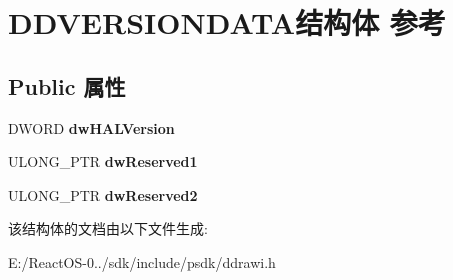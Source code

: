 \hypertarget{struct_d_d_v_e_r_s_i_o_n_d_a_t_a}{}\section{D\+D\+V\+E\+R\+S\+I\+O\+N\+D\+A\+T\+A结构体 参考}
\label{struct_d_d_v_e_r_s_i_o_n_d_a_t_a}
\subsection*{Public 属性}
\begin{DoxyCompactItemize}
\item 
\mbox{\label{struct_d_d_v_e_r_s_i_o_n_d_a_t_a_ae0788f6c466e1da557cc47803463d4ad}} 
D\+W\+O\+RD {\bfseries dw\+H\+A\+L\+Version}
\item 
\mbox{\label{struct_d_d_v_e_r_s_i_o_n_d_a_t_a_aa1a50c8efc2e8b0b309797a620691312}} 
U\+L\+O\+N\+G\+\_\+\+P\+TR {\bfseries dw\+Reserved1}
\item 
\mbox{\label{struct_d_d_v_e_r_s_i_o_n_d_a_t_a_acd7f7c65879af14605bacb79bfb94ed4}} 
U\+L\+O\+N\+G\+\_\+\+P\+TR {\bfseries dw\+Reserved2}
\end{DoxyCompactItemize}


该结构体的文档由以下文件生成\+:\begin{DoxyCompactItemize}
\item 
E\+:/\+React\+O\+S-\/0../sdk/include/psdk/ddrawi.\+h\end{DoxyCompactItemize}
